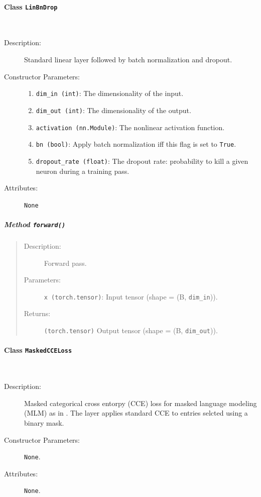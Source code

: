 \documentclass[a4paper, 10pt]{article}
\theoremstyle{plain}
\theoremstyle{definition}
\numberwithin{equation}{section}
\newcommand{\subsubsubsection}[1]{\paragraph{#1}\mbox{}\\}
\begin{document}
\subsubsubsection{Class \texttt{LinBnDrop}}

\begin{description}
    \item[Description:] Standard linear layer followed by batch normalization and dropout.
    \item[Constructor Parameters:]
        \begin{enumerate}
            \item \texttt{dim\_in (int)}: The dimensionality of the input.
            \item \texttt{dim\_out (int)}: The dimensionality of the output.
            \item \texttt{activation (nn.Module)}: The nonlinear activation function.
            \item \texttt{bn (bool)}: Apply batch normalization iff this flag is set to \texttt{True}.
            \item \texttt{dropout\_rate (float)}: The dropout rate: probability to kill a given neuron during a training pass.
        \end{enumerate}
    \item[Attributes:] \texttt{None}
\end{description}

\subparagraph{Method \texttt{forward()}}
\begin{quote}
    \begin{description}
        \item[Description:] Forward pass.
        \item[Parameters:] \texttt{x (torch.tensor)}: Input tensor (shape = (B, \texttt{dim\_in})).
        \item[Returns:] \texttt{(torch.tensor)} Output tensor (shape = (B, \texttt{dim\_out})).
    \end{description}
\end{quote}


\subsubsubsection{Class \texttt{MaskedCCELoss}}

\begin{description}
    \item[Description:] Masked categorical cross entorpy (CCE) loss for masked language modeling (MLM) as in \cite{BERT}. The layer applies standard CCE to entries selcted using a binary mask.
    \item[Constructor Parameters:] \texttt{None}.
    \item[Attributes:] \texttt{None}.
\end{description}
\end{document}
